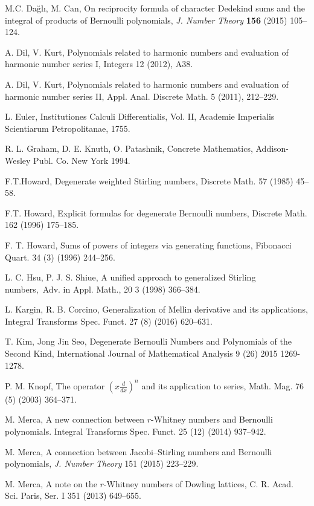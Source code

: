 \documentclass{article}%
\begin{document}
\begin{thebibliography}{99}
M.C. Da\u{g}l\i, M. Can, On reciprocity formula of character
Dedekind sums and the integral of products of Bernoulli polynomials,
\textit{J. Number Theory} \textbf{156} (2015) 105--124.

A. Dil, V. Kurt, Polynomials related to harmonic numbers and
evaluation of harmonic number series I, Integers 12 (2012), A38.

A. Dil, V. Kurt, Polynomials related to harmonic numbers and
evaluation of harmonic number series II, Appl. Anal. Discrete Math. 5 (2011), 212--229.

L. Euler, Institutiones Calculi Differentialis, Vol. II,
Academie Imperialis Scientiarum Petropolitanae, 1755.

R. L. Graham, D. E. Knuth, O. Patashnik, Concrete
Mathematics, Addison-Wesley Publ. Co. New York 1994.

F.T.Howard, Degenerate weighted Stirling numbers, Discrete
Math. 57 (1985) 45--58.

F.T. Howard, Explicit formulas for degenerate Bernoulli
numbers, Discrete Math. 162 (1996) 175--185.

F. T. Howard, Sums of powers of integers via generating
functions, Fibonacci Quart. 34 (3) (1996) 244--256.

L. C. Hsu, P. J. S. Shiue, A unified approach to generalized
Stirling numbers,\ Adv. in Appl. Math., 20 3 (1998) 366--384.

L. Kargin, R. B. Corcino, Generalization of Mellin derivative
and its applications, Integral Transforms Spec. Funct. 27 (8) (2016) 620--631.

T. Kim, Jong Jin Seo, Degenerate Bernoulli Numbers and
Polynomials of the Second Kind, International Journal of Mathematical Analysis
9 (26) 2015 1269-1278.

P. M. Knopf, The operator $\left(  x\frac{d}{dx}\right)  ^{n}$
and its application to series, Math. Mag. 76 (5) (2003) 364--371.

M. Merca, A new connection between $r$-Whitney numbers and
Bernoulli polynomials. Integral Transforms Spec. Funct. 25 (12) (2014) 937--942.

M. Merca, A connection between Jacobi--Stirling numbers and
Bernoulli polynomials, \textit{J. Number Theory }151 (2015) 223--229.

M. Merca, A note on the $r$-Whitney numbers of Dowling
lattices, C. R. Acad. Sci. Paris, Ser. I 351 (2013) 649--655.


\end{thebibliography}
\end{document}
